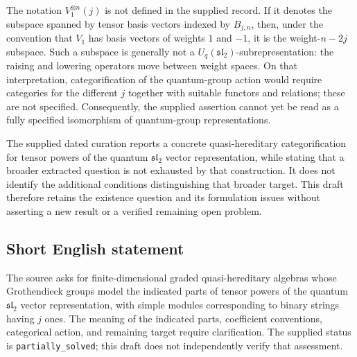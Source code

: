 \documentclass[11pt]{article}
\begin{document}
The notation \(V_1^{\otimes n}(j)\) is not defined in the supplied record. If it denotes the subspace spanned by tensor basis vectors indexed by \(B_{j,n}\), then, under the convention that \(V_1\) has basis vectors of weights \(1\) and \(-1\), it is the weight-\(n-2j\) subspace. Such a subspace is generally not a \(U_q(\mathfrak{sl}_2)\)-subrepresentation: the raising and lowering operators move between weight spaces. On that interpretation, categorification of the quantum-group action would require categories for the different \(j\) together with suitable functors and relations; these are not specified. Consequently, the supplied assertion cannot yet be read as a fully specified isomorphism of quantum-group representations.

The supplied dated curation reports a concrete quasi-hereditary categorification for tensor powers of the quantum \(\mathfrak{sl}_2\) vector representation, while stating that a broader extracted question is not exhausted by that construction. It does not identify the additional conditions distinguishing that broader target. This draft therefore retains the existence question and its formulation issues without asserting a new result or a verified remaining open problem.
\subsection{Short English statement}
The source asks for finite-dimensional graded quasi-hereditary algebras whose Grothendieck groups model the indicated parts of tensor powers of the quantum \(\mathfrak{sl}_2\) vector representation, with simple modules corresponding to binary strings having \(j\) ones. The meaning of the indicated parts, coefficient conventions, categorical action, and remaining target require clarification. The supplied status is \texttt{partially\_solved}; this draft does not independently verify that assessment.
\end{document}
